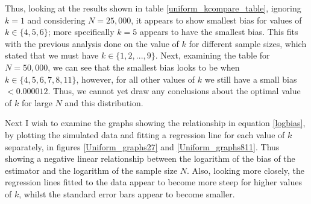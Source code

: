 \documentclass{report}
\begin{document}
Thus, looking at the results shown in table \ref{uniform_kcompare_table}, ignoring $k=1$ and considering $N=25,000$, it appears to show smallest bias for values of $k \in \{4, 5, 6 \}$; more specifically $k=5$ appears to have the smallest bias. This fits with the previous analysis done on the value of $k$ for different sample sizes, which stated that we must have $k \in \{1, 2, ..., 9\}$. Next, examining the table for $N=50,000$, we can see that the smallest bias looks to be when $k \in \{ 4, 5, 6, 7, 8, 11\}$, however, for all other values of $k$ we still have a small bias $< 0.000012$. Thus, we cannot yet draw any conclusions about the optimal value of $k$ for large $N$ and this distribution.

Next I wish to examine the graphs showing the relationship in equation \ref{logbias}, by plotting the simulated data and fitting a regression line for each value of $k$ separately, in figures \ref{Uniform_graphs27} and \ref{Uniform_graphs811}. Thus showing a negative linear relationship between the logarithm of the bias of the estimator and the logarithm of the sample size $N$. Also, looking more closely, the regression lines fitted to the data appear to become more steep for higher values of $k$, whilst the standard error bars appear to become smaller. 
\end{document}
